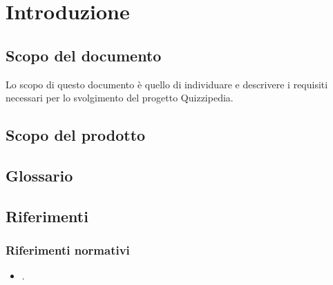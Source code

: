 \documentclass[a4paper, titlepage]{article}
\begin{document}
\pagestyle{fancy}	

\maketitle



\newpage
\tableofcontents

\newpage
\listoffigures

\newpage
\listoftables\label{lastromanpage}

\newpage
\clearpage	
{}

\section{Introduzione}
\subsection{Scopo del documento}
Lo scopo di questo documento è quello di individuare e descrivere i requisiti necessari per lo svolgimento del progetto Quizzipedia.

\subsection{Scopo del prodotto}
\SCOPO

\subsection{Glossario}
\GLOSSARIO

\subsection{Riferimenti}
\subsubsection{Riferimenti normativi}
\begin{itemize}
\item {} .
\end{itemize}
\end{document}
